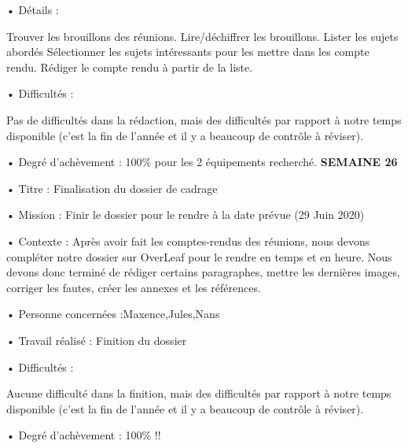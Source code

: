 \documentclass{PackagerQualityN}
\begin{document}
• Détails : 

Trouver les brouillons des réunions.
Lire/déchiffrer les brouillons.
Lister les sujets abordés
Sélectionner les sujets intéressants pour les mettre dans les compte rendu.
Rédiger le compte rendu à partir de la liste. 


• Difficultés :

Pas de difficultés dans la rédaction, mais des difficultés par rapport à notre temps disponible (c’est la fin de l’année et il y a beaucoup de contrôle à réviser).


• Degré d’achèvement : 100\% pour les 2 équipements recherché.
\newp
\textbf{SEMAINE 26}


• Titre : Finalisation du dossier de cadrage

• Mission : Finir le dossier pour le rendre à la date prévue (29 Juin 2020)

• Contexte : Après avoir fait les comptes-rendus des réunions, nous devons compléter notre dossier sur OverLeaf pour le rendre en temps et en heure. Nous devons donc terminé de rédiger certains paragraphes, mettre les dernières images, corriger les fautes, créer les annexes et les références.

• Personne concernées :Maxence,Jules,Nans

• Travail réalisé :
Finition du dossier


• Difficultés :

Aucune difficulté dans la finition, mais des difficultés par rapport à notre temps disponible (c’est la fin de l’année et il y a beaucoup de contrôle à réviser).


• Degré d’achèvement : 100\% !!



\newp       %



\end{document}
